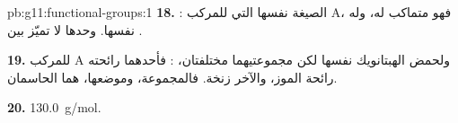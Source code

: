\begin{solution}{pb:g11:functional-groups:1}
\textbf{18.} : الصيغة نفسها التي للمركب A، فهو متماكب له، وله
 نفسها.  وحدها لا تميّز بين .

\textbf{19.} للمركب A ولحمض الهبتانويك  نفسها لكن مجموعتيهما
مختلفتان،  : فأحدهما رائحته رائحة الموز، والآخر
زنخة. فالمجموعة، وموضعها، هما الحاسمان.

\textbf{20.} \qty{130.0}{g/mol}.
\end{solution}
